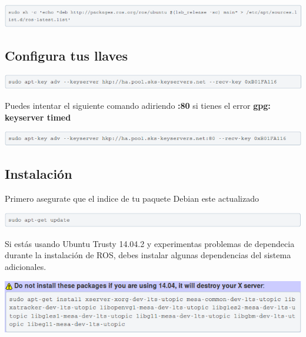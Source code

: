 \documentclass[a4paper]{book}
\begin{document}
\begin{center}
\includegraphics[width=1.2\textwidth]{Figures/Software/Install_ROS/Paso_1.png}
\end{center}

\subsection{Configura tus llaves}

\begin{center}
\includegraphics[width=1.2\textwidth]{Figures/Software/Install_ROS/Paso_2.png}
\end{center}

Puedes intentar el siguiente comando adiriendo \textbf{:80} si tienes el error \textbf{gpg: keyserver timed}

\begin{center}
\includegraphics[width=1.2\textwidth]{Figures/Software/Install_ROS/Paso_3.png}
\end{center}

\subsection{Instalación}
Primero asegurate que el indice de tu paquete Debian este actualizado

\begin{center}
\includegraphics[width=1.2\textwidth]{Figures/Software/Install_ROS/Paso_4.png}
\end{center}

Si estás usando Ubuntu Trusty 14.04.2 y experimentas problemas de dependecia durante la instalación de ROS, debes instalar algunas dependencias del sistema adicionales.

\begin{center}
\includegraphics[width=1.2\textwidth]{Figures/Software/Install_ROS/Paso_5.png}
\end{center}
\end{document}
